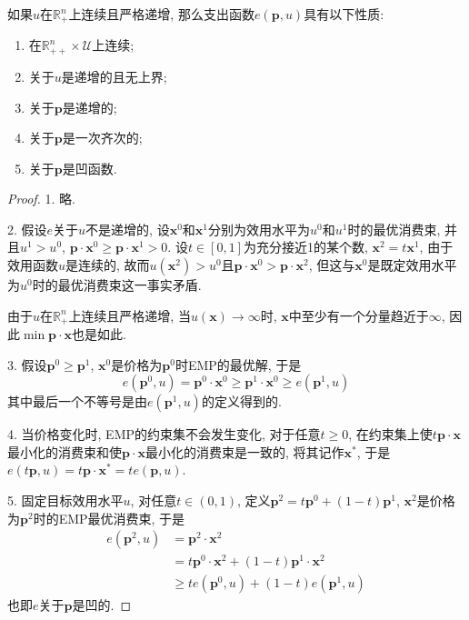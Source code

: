 \documentclass[cn, 12pt, math=mtpro2, bibstyle=apa, blue]{elegantbook}
\newcommand{\R}{\mathbb{R}}
\newcommand{\p}{\mathbf{p}}
\newcommand{\x}{\mathbf{x}}
\begin{document}
\begin{theorem}[支出函数的性质]\label{thm:thm1.6}
  如果$u$在$\R_+^n$上连续且严格递增, 那么支出函数$e(\p,u)$具有以下性质:
  \begin{enumerate}[label=\arabic*.]
    \item 在$\R_{++}^n\times\mathcal{U}$上连续;
    \item 关于$u$是递增的且无上界;
    \item 关于$\p$是递增的;
    \item 关于$\p$是一次齐次的;
    \item 关于$\p$是凹函数.
  \end{enumerate}
\end{theorem}
\begin{proof}
  1. 略.

  2. 假设$e$关于$u$不是递增的, 设$\x^0$和$\x^1$分别为效用水平为$u^0$和$u^1$时的最优消费束, 并且$u^1>u^0$, $\p\cdot\x^0\geq \p\cdot\x^1>0$. 设$t\in[0,1]$为充分接近1的某个数, $\x^2=t\x^1$, 由于效用函数$u$是连续的, 故而$u(\x^2)>u^0$且$\p\cdot\x^0>\p\cdot\x^2$, 但这与$\x^0$是既定效用水平为$u^0$时的最优消费束这一事实矛盾.

  由于$u$在$\R_+^n$上连续且严格递增, 当$u(\x)\to \infty$时, $\x$中至少有一个分量趋近于$\infty$, 因此$\min \p\cdot\x$也是如此.

  3. 假设$\p^0\ge\p^1$, $\x^0$是价格为$\p^0$时EMP的最优解, 于是
  $$e(\p^0,u)=\p^0\cdot\x^0\ge \p^1\cdot\x^0\ge e(\p^1,u)$$
  其中最后一个不等号是由$e(\p^1,u)$的定义得到的.

  4. 当价格变化时, EMP的约束集不会发生变化, 对于任意$t\ge0$, 在约束集上使$t\p\cdot\x$最小化的消费束和使$\p\cdot\x$最小化的消费束是一致的, 将其记作$\x^\ast$, 于是$e(t\p,u)=t\p\cdot\x^\ast=te(\p,u)$.

  5. 固定目标效用水平$u$, 对任意$t\in(0,1)$, 定义$\p^2=t\p^0+(1-t)\p^1$, $\x^2$是价格为$\p^2$时的EMP最优消费束, 于是
  \begin{align*}
  e(\p^2,u)&=\p^2\cdot\x^2 \\
  &=t\p^0\cdot\x^2+(1-t)\p^1\cdot\x^2 \\
  &\geq te(\p^0,u)+(1-t)e(\p^1,u)
  \end{align*}
  也即$e$关于$\p$是凹的.
\end{proof}
\end{document}
